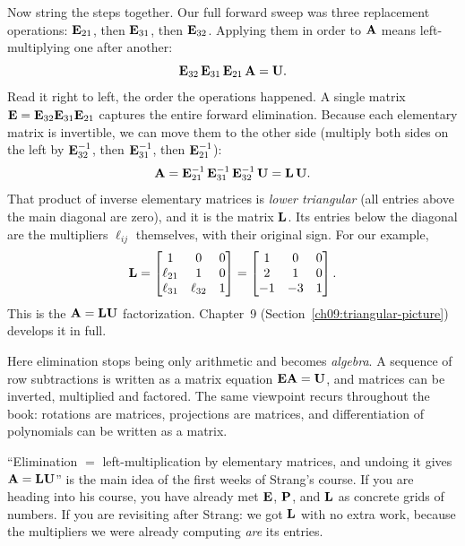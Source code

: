 Now string the steps together. Our full forward sweep was three replacement
operations: $\mathbf{E}_{21}$, then $\mathbf{E}_{31}$, then $\mathbf{E}_{32}$. Applying
them in order to $\mathbf{A}$ means left-multiplying one after another:
\[
\mathbf{E}_{32}\,\mathbf{E}_{31}\,\mathbf{E}_{21}\,\mathbf{A} = \mathbf{U}.
\]
Read it right to left, the order the operations happened. A single
matrix $\mathbf{E}=\mathbf{E}_{32}\mathbf{E}_{31}\mathbf{E}_{21}$ captures the entire forward
elimination. Because each elementary matrix is invertible, we can move them to the
other side (multiply both sides on the left by $\mathbf{E}_{32}^{-1}$, then
$\mathbf{E}_{31}^{-1}$, then $\mathbf{E}_{21}^{-1}$):
\[
\mathbf{A} = \mathbf{E}_{21}^{-1}\,\mathbf{E}_{31}^{-1}\,\mathbf{E}_{32}^{-1}\,\mathbf{U}
= \mathbf{L}\,\mathbf{U}.
\]
That product of inverse elementary matrices is \emph{lower triangular} (all
entries above the main diagonal are zero), and it is the
matrix $\mathbf{L}$. Its entries below the diagonal are the multipliers
$\ell_{ij}$ themselves, with their original sign. For our example,
\[
\mathbf{L}=\begin{bmatrix}1&0&0\\ \ell_{21}&1&0\\ \ell_{31}&\ell_{32}&1\end{bmatrix}
=\begin{bmatrix}1&0&0\\ 2&1&0\\ -1&-3&1\end{bmatrix}.
\]
This is the
$\mathbf{A}=\mathbf{LU}$ factorization. Chapter~9 (Section~\ref{ch09:triangular-picture}) develops it in full.

\begin{aestheticbox}
Here elimination stops being only arithmetic and becomes \emph{algebra}.
A sequence of row subtractions is written as a matrix equation
$\mathbf{EA}=\mathbf{U}$, and matrices can be inverted, multiplied and factored. The
same viewpoint recurs throughout the book: rotations are matrices,
projections are matrices, and differentiation of polynomials can be written as a
matrix.
\end{aestheticbox}

\begin{strangbox}
``Elimination $=$ left-multiplication by elementary matrices, and undoing it
gives $\mathbf{A}=\mathbf{LU}$'' is the main idea of the first weeks of Strang's course.
If you are heading into his course, you have already met
$\mathbf{E}$, $\mathbf{P}$, and $\mathbf{L}$ as concrete grids of numbers. If you are
revisiting after Strang: we got $\mathbf{L}$ with no extra work, because
the multipliers we were already computing \emph{are} its entries.
\end{strangbox}

